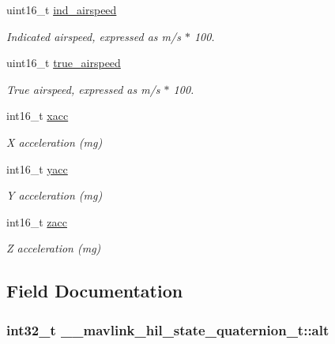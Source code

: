 \begin{DoxyCompactItemize}
uint16\+\_\+t \hyperlink{struct____mavlink__hil__state__quaternion__t_a78c835fba2a49d66fd73d745d347fac5}{ind\+\_\+airspeed}
\begin{DoxyCompactList}\small\item\em Indicated airspeed, expressed as m/s $\ast$ 100. \end{DoxyCompactList}\item 
uint16\+\_\+t \hyperlink{struct____mavlink__hil__state__quaternion__t_ac644e31d08eeed05f5f3b7eacdd18f4b}{true\+\_\+airspeed}
\begin{DoxyCompactList}\small\item\em True airspeed, expressed as m/s $\ast$ 100. \end{DoxyCompactList}\item 
int16\+\_\+t \hyperlink{struct____mavlink__hil__state__quaternion__t_a72af144dbb58ba6cd5a474206a88420f}{xacc}
\begin{DoxyCompactList}\small\item\em X acceleration (mg) \end{DoxyCompactList}\item 
int16\+\_\+t \hyperlink{struct____mavlink__hil__state__quaternion__t_a949a82c6d368468354dd201cda5458fa}{yacc}
\begin{DoxyCompactList}\small\item\em Y acceleration (mg) \end{DoxyCompactList}\item 
int16\+\_\+t \hyperlink{struct____mavlink__hil__state__quaternion__t_a8e4533aa8c582bf609a813b65835fe52}{zacc}
\begin{DoxyCompactList}\small\item\em Z acceleration (mg) \end{DoxyCompactList}\end{DoxyCompactItemize}


\subsection{Field Documentation}
\hypertarget{struct____mavlink__hil__state__quaternion__t_abde8333e57ef71852b1de1529f3f3146}{
\subsubsection[{alt}]{\setlength{\rightskip}{0pt plus 5cm}int32\+\_\+t \+\_\+\+\_\+mavlink\+\_\+hil\+\_\+state\+\_\+quaternion\+\_\+t\+::alt}}\label{struct____mavlink__hil__state__quaternion__t_abde8333e57ef71852b1de1529f3f3146}


